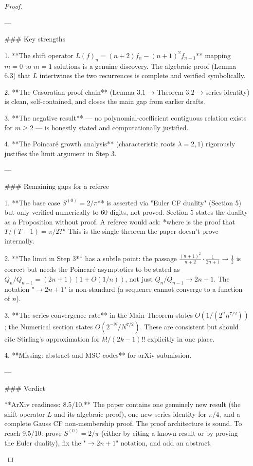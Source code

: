 \begin{theorem}
\begin{lemma}
\begin{proposition}
\begin{corollary}
\begin{proof}
\begin{remark}
---

### Key strengths

1. **The shift operator $L(f)_n = (n+2)f_n - (n+1)^2 f_{n-1}$** mapping $m=0$ to $m=1$ solutions is a genuine discovery. The algebraic proof (Lemma 6.3) that $L$ intertwines the two recurrences is complete and verified symbolically.

2. **The Casoratian proof chain** (Lemma 3.1 → Theorem 3.2 → series identity) is clean, self-contained, and closes the main gap from earlier drafts.

3. **The negative result** — no polynomial-coefficient contiguous relation exists for $m \geq 2$ — is honestly stated and computationally justified.

4. **The Poincaré growth analysis** (characteristic roots $\lambda = 2, 1$) rigorously justifies the limit argument in Step 3.

---

### Remaining gaps for a referee

1. **The base case $S^{(0)} = 2/\pi$** is asserted via "Euler CF duality" (Section 5) but only verified numerically to 60 digits, not proved. Section 5 states the duality as a Proposition without proof. A referee would ask: *where is the proof that $T/(T-1) = \pi/2$?* This is the single theorem the paper doesn't prove internally.

2. **The limit in Step 3** has a subtle point: the passage $\frac{(n+1)^2}{n+2} \cdot \frac{1}{2n+1} \to \frac{1}{2}$ is correct but needs the Poincaré asymptotics to be stated as $Q_n/Q_{n-1} = (2n+1)(1 + O(1/n))$, not just $Q_n/Q_{n-1} \to 2n+1$. The notation "$\to 2n+1$" is non-standard (a sequence cannot converge to a function of $n$).

3. **The series convergence rate** in the Main Theorem states $O(1/(2^n n^{7/2}))$; the Numerical section states $O(2^{-N}/N^{7/2})$. These are consistent but should cite Stirling's approximation for $k!/(2k-1)!!$ explicitly in one place.

4. **Missing: abstract and MSC codes** for arXiv submission.

---

### Verdict

**ArXiv readiness: 8.5/10.** The paper contains one genuinely new result (the shift operator $L$ and its algebraic proof), one new series identity for $\pi/4$, and a complete Gauss CF non-membership proof. The proof architecture is sound. To reach 9.5/10: prove $S^{(0)} = 2/\pi$ (either by citing a known result or by proving the Euler duality), fix the "$\to 2n+1$" notation, and add an abstract.


\end{remark}
\end{proof}
\end{corollary}
\end{proposition}
\end{lemma}
\end{theorem}
